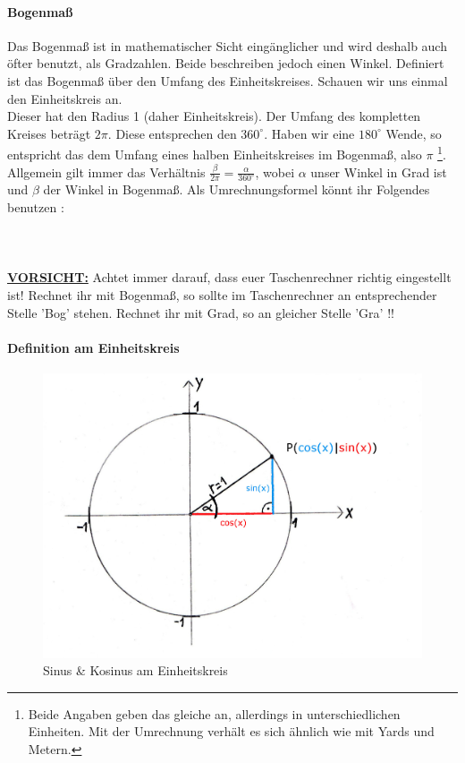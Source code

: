 		\paragraph{Bogenmaß}
			Das Bogenmaß ist in mathematischer Sicht eingänglicher und wird deshalb auch
			öfter benutzt, als Gradzahlen. Beide beschreiben jedoch einen Winkel.
			Definiert ist das Bogenmaß über den Umfang des Einheitskreises. Schauen wir
			uns einmal den Einheitskreis an.\\
			Dieser hat den Radius 1 (daher Einheitskreis). Der Umfang des kompletten
			Kreises beträgt \(2\pi\). Diese entsprechen den \(360^\circ\). Haben wir eine
			\(180^\circ\) Wende, so entspricht das dem Umfang eines halben
			Einheitskreises im Bogenmaß, also \(\pi\) \footnote{Beide Angaben geben das
			gleiche an, allerdings in unterschiedlichen Einheiten. Mit der Umrechnung
			verhält es sich ähnlich wie mit Yards und Metern.}. Allgemein gilt immer das
			Verhältnis \(\frac{\beta}{2\pi}=\frac{\alpha}{360^\circ}\), wobei \(\alpha\)
			unser Winkel in Grad ist und \(\beta\) der Winkel in Bogenmaß. Als
			Umrechnungsformel könnt ihr Folgendes benutzen :
			\\ \\
			\formel{\[\beta=\frac{\pi \cdot \alpha}{180^\circ}\]}
			\\ \\
			\underline{\textbf{VORSICHT:}} Achtet immer darauf, dass euer Taschenrechner
			richtig eingestellt ist! Rechnet ihr mit Bogenmaß, so sollte im
			Taschenrechner an entsprechender Stelle 'Bog' stehen. Rechnet ihr mit Grad,
			so an gleicher Stelle 'Gra' !!
		\paragraph{Definition am Einheitskreis}
	   
			\begin{figure}[h]
				\centering
				\includegraphics[scale=0.2]{Images/Einheitskreis.jpeg}
				\caption{Sinus \& Kosinus am Einheitskreis}
			\end{figure}
  
